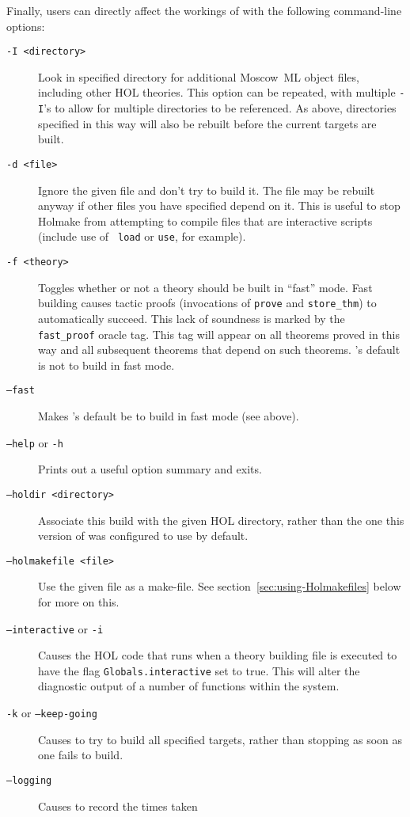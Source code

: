 \noindent Finally, users can directly affect the workings of \holmake{}
with the following command-line options:
\begin{description}
\item[\tt -I <directory>] Look in specified directory for additional
  Moscow~ML object files, including other HOL theories.  This option
  can be repeated, with multiple {\tt -I}'s to allow for multiple
  directories to be referenced.  As above, directories specified in
  this way will also be rebuilt before the current targets are built.
\item[\tt -d <file>] Ignore the given file and don't try to build it.
  The file may be rebuilt anyway if other files you have specified
  depend on it.  This is useful to stop Holmake from attempting to
  compile files that are interactive scripts (include use of {\tt
  load} or {\tt use}, for example).
\item[\texttt{-f <theory>}] Toggles whether or not a theory should be
  built in ``fast'' mode.  Fast building causes tactic proofs
  (invocations of \texttt{prove} and \texttt{store\_thm}) to
  automatically succeed.  This lack of soundness is marked by the
  \texttt{fast\_proof} oracle tag.  This tag will appear on all
  theorems proved in this way and all subsequent theorems that depend
  on such theorems.  \holmake's default is not to build in fast mode.
\item[\texttt{--fast}] Makes \holmake's default be to build in fast
  mode (see above).
\item[{\tt --help} or {\tt -h}] Prints out a useful option summary and
  exits.
\item[\tt --holdir <directory>] Associate this build with the given
  HOL directory, rather than the one this version of \holmake{} was
  configured to use by default.
\item[\tt --holmakefile <file>] Use the given file as a make-file.
  See section~\ref{sec:using-Holmakefiles} below for more on this.
\item[\texttt{--interactive} or \texttt{-i}] Causes the HOL code that
  runs when a theory building file is executed to have the flag
  \texttt{Globals.interactive} set to true.  This will alter the diagnostic
  output of a number of functions within the system.
\item[\texttt{-k} or \texttt{--keep-going}] Causes \holmake{} to try
  to build all specified targets, rather than stopping as soon as one
  fails to build.
\item[\texttt{--logging}] Causes \holmake{} to record the times taken

\end{description}
